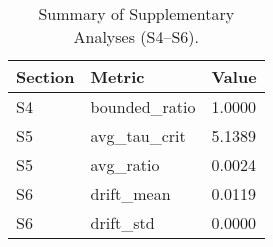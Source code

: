 \begin{table}[h!]
\centering
\caption{Summary of Supplementary Analyses (S4--S6).}
\label{tab:supplementary_summary}
\begin{tabular}{lll}
\hline
Section & Metric & Value \\
\hline
S4 & bounded\_ratio & 1.0000 \\
S5 & avg\_tau\_crit & 5.1389 \\
S5 & avg\_ratio & 0.0024 \\
S6 & drift\_mean & 0.0119 \\
S6 & drift\_std & 0.0000 \\
\hline
\end{tabular}
\end{table}